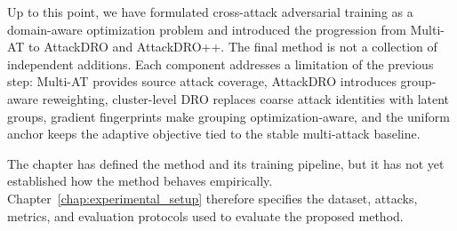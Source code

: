 
Up to this point, we have formulated cross-attack adversarial training as a domain-aware
optimization problem and introduced the progression from Multi-AT to AttackDRO
and AttackDRO++. The final method is not a collection of independent additions. Each
component addresses a limitation of the previous step: Multi-AT provides source attack
coverage, AttackDRO introduces group-aware reweighting, cluster-level DRO replaces coarse
attack identities with latent groups, gradient fingerprints make grouping
optimization-aware, and the uniform anchor keeps the adaptive objective tied to the
stable multi-attack baseline.

The chapter has defined the method and its training pipeline, but it has not yet
established how the method behaves empirically. Chapter~\ref{chap:experimental_setup}
therefore specifies the dataset, attacks, metrics, and evaluation protocols used
to evaluate the proposed method.
